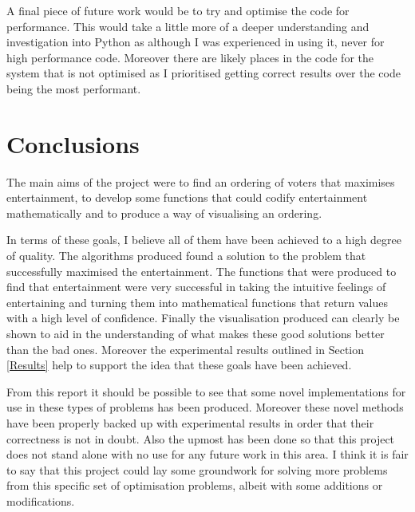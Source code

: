 \documentclass[12pt]{report}
\begin{document}
A final piece of future work would be to try and optimise the code for performance. This would take a little more of a deeper understanding and investigation into Python as although I was experienced in using it, never for high performance code. Moreover there are likely places in the code for the system that is not optimised as I prioritised getting correct results over the code being the most performant.

\section{Conclusions}\label{Conclusions}
The main aims of the project were to find an ordering of voters that maximises entertainment, to develop some functions that could codify entertainment mathematically and to produce a way of visualising an ordering.

In terms of these goals, I believe all of them have been achieved to a high degree of quality. The algorithms produced found a solution to the problem that successfully maximised the entertainment. The functions that were produced to find that entertainment were very successful in taking the intuitive feelings of entertaining and turning them into mathematical functions that return values with a high level of confidence. Finally the visualisation produced can clearly be shown to aid in the understanding of what makes these good solutions better than the bad ones. Moreover the experimental results outlined in Section \ref{Results} help to support the idea that these goals have been achieved.

From this report it should be possible to see that some novel implementations for use in these types of problems has been produced. Moreover these novel methods have been properly backed up with experimental results in order that their correctness is not in doubt. Also the upmost has been done so that this project does not stand alone with no use for any future work in this area. I think it is fair to say that this project could lay some groundwork for solving more problems from this specific set of optimisation problems, albeit with some additions or modifications.
\end{document}
